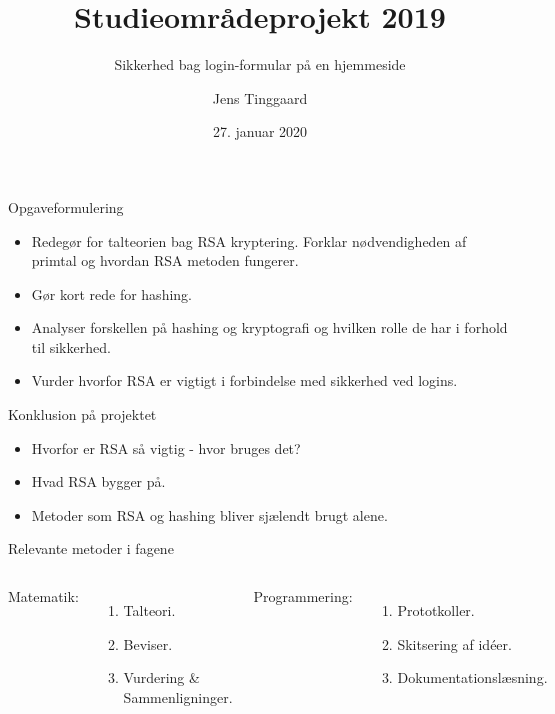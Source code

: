 \documentclass[10pt, aspectratio=169, usepdftitle=false]{beamer}
\title{Studieområdeprojekt 2019}
\subtitle{Sikkerhed bag login-formular på en hjemmeside}
\date{27. januar 2020}
\author{Jens Tinggaard}
\institute{Odense Tekniske Gymnasium}
\begin{document}
\maketitle


\begin{frame}{Opgaveformulering}
\begin{itemize}
    \large
    \item Redegør for talteorien bag RSA kryptering. Forklar nødvendigheden af primtal og hvordan RSA metoden fungerer.
    \item Gør kort rede for hashing.
    \item Analyser forskellen på hashing og kryptografi og hvilken rolle de har i forhold til sikkerhed.
    \item Vurder hvorfor RSA er vigtigt i forbindelse med sikkerhed ved logins.
\end{itemize}
\end{frame}

\begin{frame}{Konklusion på projektet}
    \begin{itemize}
        \large
        \item Hvorfor er RSA så vigtig - hvor bruges det?
        \item Hvad RSA bygger på.
        \item Metoder som RSA og hashing bliver sjælendt brugt alene.
    \end{itemize}
\end{frame}

\begin{frame}{Relevante metoder i fagene}
    \begin{columns}[T,onlytextwidth]
            \alert{Matematik:}
            \begin{enumerate}
                \item Talteori.
                \item Beviser. %
                \item Vurdering \& Sammenligninger.
            \end{enumerate}
            \alert{Programmering:}
            \begin{enumerate}
                \item Prototkoller.
                \item Skitsering af id\'eer.
                \item Dokumentationslæsning.
            \end{enumerate}
    \end{columns}
\end{frame}
\end{document}
